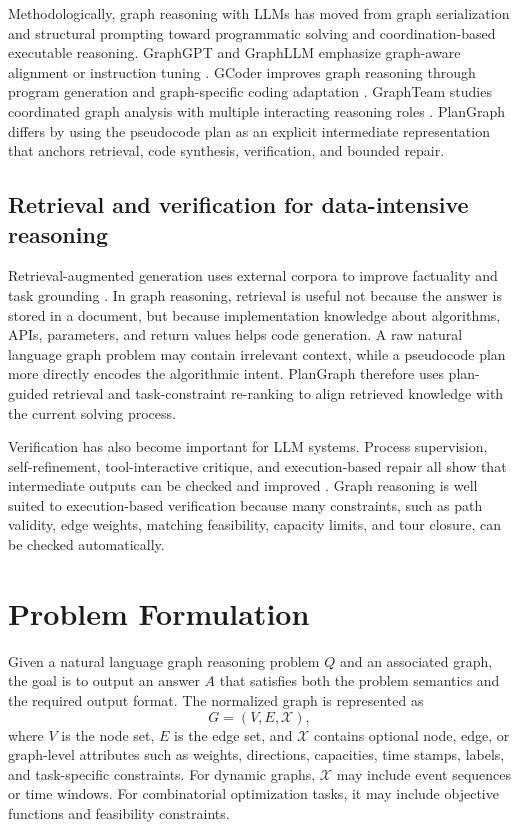 \documentclass[pdflatex,sn-mathphys-num]{sn-jnl}
\theoremstyle{thmstyleone}
\theoremstyle{thmstyletwo}
\theoremstyle{thmstylethree}
\begin{document}
Methodologically, graph reasoning with LLMs has moved from graph serialization and structural prompting toward programmatic solving and coordination-based executable reasoning. GraphGPT and GraphLLM emphasize graph-aware alignment or instruction tuning \cite{tang2024graphgpt,chai2023graphllm}. GCoder improves graph reasoning through program generation and graph-specific coding adaptation \cite{zhang2025gcoder}. GraphTeam studies coordinated graph analysis with multiple interacting reasoning roles \cite{li2024graphteam}. PlanGraph differs by using the pseudocode plan as an explicit intermediate representation that anchors retrieval, code synthesis, verification, and bounded repair.

\subsection{Retrieval and verification for data-intensive reasoning}

Retrieval-augmented generation uses external corpora to improve factuality and task grounding \cite{karpukhin2020dpr,lewis2020rag,izacard2023atlas,gao2024ragsurvey}. In graph reasoning, retrieval is useful not because the answer is stored in a document, but because implementation knowledge about algorithms, APIs, parameters, and return values helps code generation. A raw natural language graph problem may contain irrelevant context, while a pseudocode plan more directly encodes the algorithmic intent. PlanGraph therefore uses plan-guided retrieval and task-constraint re-ranking to align retrieved knowledge with the current solving process.

Verification has also become important for LLM systems. Process supervision, self-refinement, tool-interactive critique, and execution-based repair all show that intermediate outputs can be checked and improved \cite{madaan2023selfrefine,lightman2023processreward,critic2024}. Graph reasoning is well suited to execution-based verification because many constraints, such as path validity, edge weights, matching feasibility, capacity limits, and tour closure, can be checked automatically.

\section{Problem Formulation}\label{sec:problem}

Given a natural language graph reasoning problem $Q$ and an associated graph, the goal is to output an answer $A$ that satisfies both the problem semantics and the required output format. The normalized graph is represented as
\begin{equation}
G=(V,E,\mathcal{X}),
\end{equation}
where $V$ is the node set, $E$ is the edge set, and $\mathcal{X}$ contains optional node, edge, or graph-level attributes such as weights, directions, capacities, time stamps, labels, and task-specific constraints. For dynamic graphs, $\mathcal{X}$ may include event sequences or time windows. For combinatorial optimization tasks, it may include objective functions and feasibility constraints.
\end{document}
